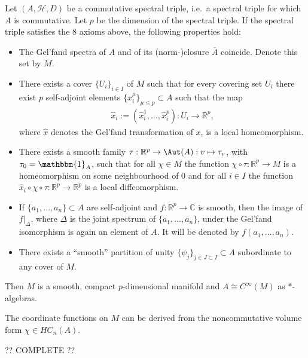     \begin{construct}
        Let $(A,\mathcal{H},D)$ be a commutative spectral triple, i.e.~a spectral triple for which $A$ is commutative. Let $p$ be the dimension of the spectral triple. If the spectral triple satisfies the 8 axioms above, the following properties hold:
        \begin{itemize}
            \item The Gel'fand spectra of $A$ and of its (norm-)closure $\overline{A}$ coincide. Denote this set by $M$.
            \item There exists a cover $\{U_i\}_{i\in I}$ of $M$ such that for every covering set $U_i$ there exist $p$ self-adjoint elements $\{x^\mu_i\}_{\mu\leq p}\subset A$ such that the map
            \begin{gather}
                \widehat{x}_i:=(\widehat{x}^1_i,\ldots,\widehat{x}^p_i):U_i\rightarrow\mathbb{R}^p,
            \end{gather}
            where $\widehat{x}$ denotes the Gel'fand transformation of $x$, is a local homeomorphism.
            \item There exists a smooth family $\tau:\mathbb{R}^p\rightarrow\Aut(A):v\mapsto\tau_v$, with $\tau_0=\mathbbm{1}_A$, such that for all $\chi\in M$ the function $\chi\circ\tau:\mathbb{R}^p\rightarrow M$ is a homeomorphism on some neighbourhood of 0 and for all $i\in I$ the function $\widehat{x}_i\circ\chi\circ\tau:\mathbb{R}^p\rightarrow\mathbb{R}^p$ is a local diffeomorphism.
            \item If $\{a_1,\ldots,a_n\}\subset A$ are self-adjoint and $f:\mathbb{R}^p\rightarrow\mathbb{C}$ is smooth, then the image of $f|_\Delta$, where $\Delta$ is the joint spectrum of $\{a_1,\ldots,a_n\}$, under the Gel'fand isomorphism is again an element of $A$. It will be denoted by $f(a_1,\ldots,a_n)$.
            \item There exists a ``smooth'' partition of unity $\{\psi_j\}_{j\in J\subset I}\subset A$ subordinate to any cover of $M$.
        \end{itemize}
        Then $M$ is a smooth, compact $p$-dimensional manifold and $A\cong C^\infty(M)$ as $\ast$-algebras.

        The coordinate functions on $M$ can be derived from the noncommutative volume form $\chi\in HC_n(A)$.

        ?? COMPLETE ??
    \end{construct}

